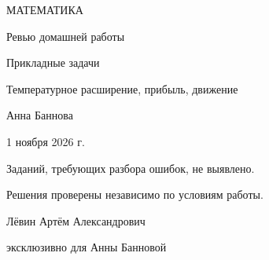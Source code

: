 \documentclass[a4paper,12pt]{article}
\begin{document}
\color{ink}
\begin{center}
\vspace*{20mm}
{\color{accent}\large МАТЕМАТИКА}\par
\vspace{16mm}
{\LARGE Ревью домашней работы}\par
\vspace{14mm}
{\Large\color{accent} Прикладные задачи}\par
\vspace{4mm}
{\normalsize Температурное расширение, прибыль, движение}\par
\vspace{28mm}
{\normalsize Анна Баннова}\par
\vspace{11mm}
{\normalsize 1 ноября 2026 г.}\par
\vspace{19mm}
\begin{minipage}{.82\linewidth}
\centering
\large Заданий, требующих разбора ошибок, не выявлено.\par
\vspace{4mm}
\normalsize Решения проверены независимо по условиям работы.\par
\end{minipage}
\vfill
{\small Лёвин Артём Александрович}\par
{\small эксклюзивно для Анны Банновой}\par
\vspace{8mm}
\end{center}
\end{document}
